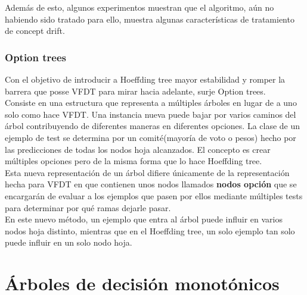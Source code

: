 Además de esto, algunos experimentos muestran que el algoritmo, aún no habiendo sido tratado para ello, muestra algunas características de tratamiento de concept drift.

\subsubsection{Option trees}

Con el objetivo de introducir a Hoeffding tree mayor estabilidad y romper la barrera que posse VFDT para mirar hacia adelante, surje Option trees\cite{ref13}.\\
Consiste en una estructura que representa a múltiples árboles en lugar de a uno solo como hace VFDT. Una instancia nueva puede bajar por varios caminos del árbol contribuyendo de diferentes maneras en diferentes opciones. La clase de un ejemplo de test se determina por un comité(mayoría de voto o pesos) hecho por las predicciones de todas los nodos hoja alcanzados. El concepto es crear múltiples opciones pero de la misma forma que lo hace Hoeffding tree.\\
Esta nueva representación de un árbol difiere únicamente de la representación hecha para VFDT en que contienen unos nodos llamados \textbf{nodos opción} que se encargarán de evaluar a los ejemplos que pasen por ellos mediante múltiples tests para determinar por qué ramas dejarle pasar.\\
En este nuevo método, un ejemplo que entra al árbol puede influir en varios nodos hoja distinto, mientras que en el Hoeffding tree, un solo ejemplo tan solo puede influir en un solo nodo hoja.

\section{Árboles de decisión monotónicos}


\newpage


